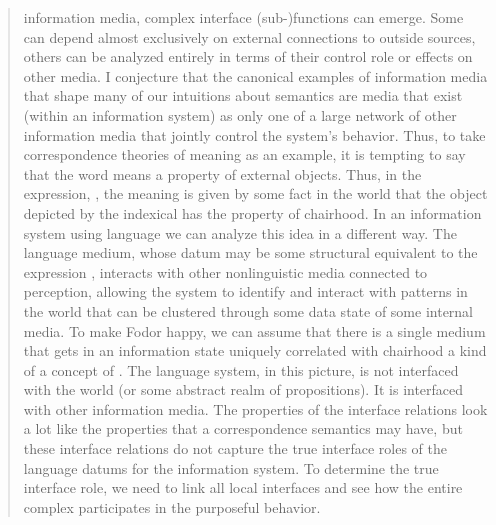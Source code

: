 {\begin{quote}
information media, complex interface (sub-)functions
can emerge. Some can depend almost exclusively on
external connections to outside sources, others can be
analyzed entirely in terms of their control role or effects
on other media. I conjecture that the canonical
examples of information media that shape many of our
intuitions about semantics are media that exist (within
an information system) as only one of a large network
of other information media that jointly control the system's
behavior. Thus, to take correspondence theories
of meaning as an example, it is tempting to say that
the word  means a property of external objects.
Thus, in the expression, , the meaning
is given by some fact in the world that the object depicted
by the indexical has the property of chairhood.
In an information system using language we can analyze
this idea in a different way. The language medium,
whose datum may be some structural equivalent to the
expression , interacts with other nonlinguistic
media connected to perception, allowing the
system to identify and interact with patterns in the
world that can be clustered through some data state
of some internal media. To make Fodor happy, we can
assume that there is a single medium that gets in an information
state uniquely correlated with chairhood \mdash{}
a kind of a concept of .  The language system, in
this picture, is not interfaced with the world (or some
abstract realm of propositions).  It is interfaced with
other information media. The properties of the interface
relations look a lot like the properties that a correspondence
semantics may have, but these interface relations
do not capture the true interface roles of the language
datums for the information system. To determine the
true interface role, we need to link all local interfaces
and see how the entire complex participates in the purposeful
behavior.  \cite[p. 17]{OrlinVakarelov}
\end{quote}
}
